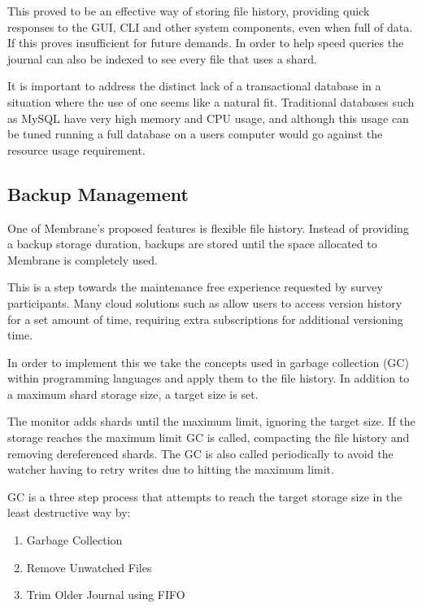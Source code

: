 \documentclass[11pt, a4paper, twoside]{report}
\begin{document}
This proved to be an effective way of storing file history, providing quick responses to the GUI, CLI and other system components, even when full of data. If this proves insufficient for future demands. In order to help speed queries the journal can also be indexed to see every file that uses a shard.

It is important to address the distinct lack of a transactional database in a situation where the use of one seems like a natural fit. Traditional databases such as MySQL have very high memory and CPU usage, \citep{james2017sql} and although this usage can be tuned running a full database on a users computer would go against the resource usage requirement.

\subsection{Backup Management}

One of Membrane's proposed features is flexible file history. Instead of providing a backup storage duration, backups are stored until the space allocated to Membrane is completely used.

This is a step towards the maintenance free experience requested by survey participants. Many cloud solutions such as \cite{dropbox2017versions} allow users to access version history for a set amount of time, requiring extra subscriptions for additional versioning time.

In order to implement this we take the concepts used in garbage collection (GC) within programming languages and apply them to the file history. In addition to a maximum shard storage size, a target size is set.

The monitor adds shards until the maximum limit, ignoring the target size. If the storage reaches the maximum limit GC is called, compacting the file history and removing dereferenced shards. The GC is also called periodically to avoid the watcher having to retry writes due to hitting the maximum limit.

GC is a three step process that attempts to reach the target storage size in the least destructive way by:

\begin{enumerate}
 \item Garbage Collection
 \item Remove Unwatched Files
 \item Trim Older Journal using FIFO
\end{enumerate}
\end{document}
